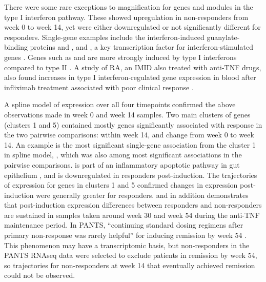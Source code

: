 There were some rare exceptions to magnification for genes and modules in the type I interferon pathway.
These showed upregulation in non-responders from week 0 to week 14,
yet were either downregulated or not significantly different for responders.
Single-gene examples include the interferon-induced guanylate-binding proteins  and  \autocite{tretina2019InterferoninducedGuanylatebindingProteins}, 
and , a key transcription factor for interferon-stimulated genes \autocite{schneider2014InterferonStimulatedGenesComplex}.
Genes such as  and  are more strongly induced by type I interferons compared to type II \autocite{liu2012SystematicIdentificationType}.
A study of \gls{RA},
an \gls{IMID} also treated with anti-\gls{TNF} drugs,
also found increases in type I interferon-regulated gene expression in blood after infliximab treatment associated with poor clinical response \autocite{vanbaarsen2010RegulationIFNResponse}.

A spline model of expression over all four timepoints confirmed the above observations made in week 0 and week 14 samples.
Two main clusters of genes (clusters 1 and 5) contained mostly genes significantly associated with response in the two pairwise comparisons: within week 14, and change from week 0 to week 14.
An example is the most significant single-gene association from the cluster 1 in spline model, , 
which was also among most significant associations in the pairwise comparisons.
 is part of an inflammatory apoptotic pathway in gut epithelium \autocite{laukoetter2008O014IFNGammaInduces}, 
and is downregulated in responders post-induction.
The trajectories of expression for genes in clusters 1 and 5 confirmed changes in expression post-induction were generally greater for responders.
and in addition demonstrates that post-induction expression differences between responders and non-responders are sustained
in samples taken around week 30 and week 54 during the anti-\gls{TNF} maintenance period.
In \gls{PANTS}, \enquote{continuing standard dosing regimens after primary non-response was rarely helpful} for inducing remission by week 54 \autocite{kennedy2019PredictorsAntiTNFTreatment}.
This phenomenon may have a transcriptomic basis,
but non-responders in the \gls{PANTS} \gls{RNAseq} data were selected to exclude patients in remission by week 54,
so trajectories for non-responders at week 14 that eventually achieved remission could not be observed.

